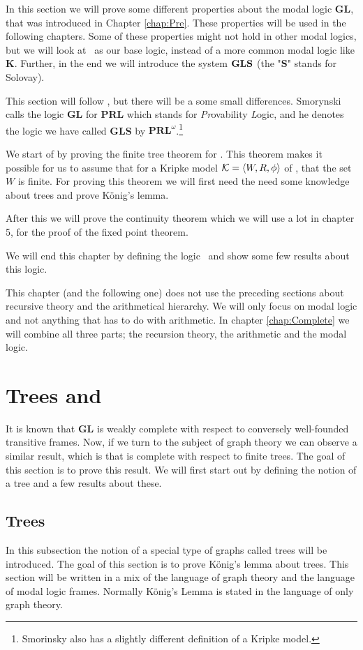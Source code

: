 \documentclass[../main.tex]{subfiles}
\begin{document}
In this section we will prove some different properties about the modal logic
\textbf{GL}, that was introduced in Chapter \ref{chap:Pre}.
These properties will be used in the following chapters. Some of these
properties might not
hold in other modal logics, but we will look at \GL\ as our base logic,
instead of a more common modal logic like \textbf{K}.
Further, in the end we will introduce the system $\text{\textbf{GLS}}$ (the
"\textbf{S}" stands for Solovay).

This section will follow \citet{Smor1985}, but there will be a some small
differences. Smorynski calls the logic \textbf{GL} for \textbf{PRL} which
stands for \textit{Pr}ovability \textit{L}ogic, and he denotes the logic we
have called \textbf{GLS} by $\textbf{PRL}^\omega$.\footnote{Smorinsky also has a
slightly different definition of a Kripke model.}

We start of by proving the finite tree theorem for \GL. This theorem makes it
possible for us to assume that for a Kripke model $\mathcal{K}=\langle W,R,\phi\rangle$ of
\GL, that the set $W$ is finite. For proving this theorem we will first need
the need some knowledge about trees and
prove König's lemma.

After this we will prove the continuity theorem which we will use a lot in
chapter 5, for the proof of the fixed point theorem.

We will end this chapter by defining the logic \GLS\ and show some few results
about this logic.

This chapter (and the following one) does not use the preceding sections about
recursive theory and the arithmetical hierarchy. We will only
focus on modal logic and not anything that has to do with arithmetic. In
chapter \ref{chap:Complete} we will combine all three parts; the recursion
theory, the arithmetic and the modal logic.


\section{Trees and \GL}

It is known that \textbf{GL} is weakly complete with respect to conversely
well-founded transitive frames. Now, if we turn to the subject of graph theory we can observe a 
similar result, which is that \GL is complete with respect to finite trees.  The goal of this
section is to prove this result. We will first start out by defining the notion
of a tree and a few results about these.

\subsection{Trees}
In this subsection the notion of a special type of graphs called trees will be
introduced. The goal of this section is to prove König's lemma about trees. 
This section will be written in a mix of the language of graph theory and the
language of modal logic frames. Normally König's Lemma is stated in the
language of only graph theory.
\end{document}
